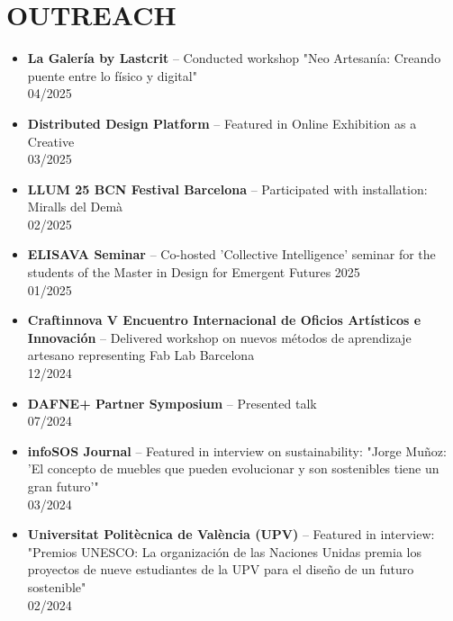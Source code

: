 \documentclass[11pt,a4paper]{article}
\begin{document}
\section*{OUTREACH}
\begin{itemize}[leftmargin=*,label={},itemsep=2pt]
    \item \textbf{La Galería by Lastcrit} -- Conducted workshop "Neo Artesanía: Creando puente entre lo físico y digital"\\
    04/2025

    \item \textbf{Distributed Design Platform} -- Featured in Online Exhibition as a Creative\\
    03/2025
    
    \item \textbf{LLUM 25 BCN Festival Barcelona} -- Participated with installation: Miralls del Dem\`a\\
    02/2025
    
    \item \textbf{ELISAVA Seminar} -- Co-hosted 'Collective Intelligence' seminar for the students of the Master in Design for Emergent Futures 2025\\
    01/2025
    
    \item \textbf{Craftinnova V Encuentro Internacional de Oficios Artísticos e Innovación} -- Delivered workshop on nuevos m\'etodos de aprendizaje artesano representing Fab Lab Barcelona\\
    12/2024
    
    \item \textbf{DAFNE+ Partner Symposium} -- Presented talk\\
    07/2024
    
    \item \textbf{infoSOS Journal} -- Featured in interview on sustainability: "Jorge Mu\~noz: 'El concepto de muebles que pueden evolucionar y son sostenibles tiene un gran futuro'"\\
    03/2024
    
    \item \textbf{Universitat Polit\`ecnica de Val\`encia (UPV)} -- Featured in interview: "Premios UNESCO: La organizaci\'on de las Naciones Unidas premia los proyectos de nueve estudiantes de la UPV para el dise\~no de un futuro sostenible"\\
    02/2024
    
\end{itemize}
\end{document}
